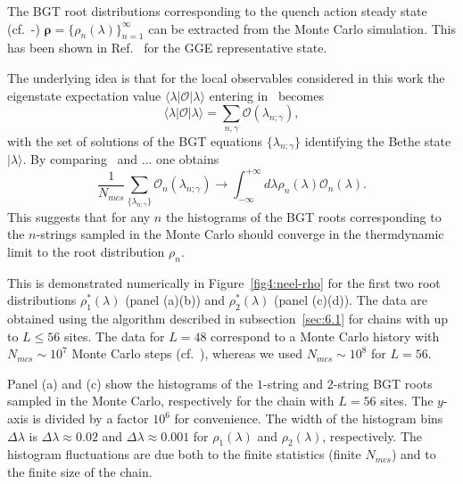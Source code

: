 \documentclass[11pt]{iopart}
\begin{document}
The BGT root distributions corresponding to the quench action steady state 
(cf.~-) $\pmb{\rho}=\{\rho_n(\lambda)\}_{n=1}^{\infty}$ can be extracted 
from the Monte Carlo simulation.  This has been shown in Ref.~\cite{alba-2015} for 
the GGE representative state. 

The underlying idea is that for the local observables considered in this 
work the eigenstate expectation value $\langle\lambda|{\mathcal O}|\lambda\rangle$
entering in~ becomes
%
\begin{equation}
\langle\lambda|{\mathcal O}|\lambda\rangle=\sum\limits_{n,\gamma}{\mathcal O}
(\lambda_{n;\gamma}), 
\end{equation}
%
with the set of solutions of the BGT equations $\{\lambda_{n;\gamma}\}$ identifying 
the Bethe state $|\lambda\rangle$. 
By comparing~ and ... one obtains
%
\begin{equation}
\frac{1}{N_{mcs}}\sum\limits_{\{\lambda_{n;\gamma}\}}{\mathcal O}_n(\lambda_{n;\gamma})
\to\int_{-\infty}^{+\infty}d\lambda\rho_{n}(\lambda){\mathcal O}_n(\lambda). 
\end{equation}
%
This suggests that for any $n$ the histograms of the BGT roots corresponding to the 
$n$-strings sampled in the Monte Carlo should converge in the thermdynamic limit to 
the root distribution $\rho_n$. 

This is demonstrated numerically in Figure~\ref{fig4:neel-rho} for the first two root 
distributions $\rho^*_1(\lambda)$ (panel (a)(b)) and $\rho^*_2(\lambda)$ (panel 
(c)(d)). The data are obtained using the algorithm described in subsection~\ref{sec:6.1} 
for chains with up to $L\le 56$ sites. The data for $L=48$ correspond to a Monte Carlo 
history with $N_{mcs}\sim 10^7$ Monte Carlo steps (cf.~), whereas we 
used $N_{mcs}\sim 10^8$ for $L=56$. 

Panel (a) and (c) show the  histograms of the $1$-string and $2$-string BGT roots sampled 
in the Monte Carlo, respectively for the chain with $L=56$ sites. The $y$-axis is 
divided by a factor $10^6$ for convenience. The width of the histogram bins $\Delta\lambda$ 
is $\Delta\lambda\approx0.02$ and $\Delta\lambda\approx0.001$ for $\rho_1(\lambda)$ 
and $\rho_2(\lambda)$, respectively. The histogram fluctuations are due both to the finite 
statistics (finite $N_{mcs}$) and to the finite size of the chain. 
\end{document}
